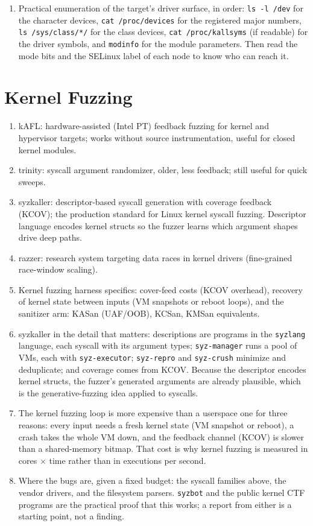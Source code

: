 \documentclass[12pt]{Training}
\begin{document}
\begin{enumerate}
    \item Practical enumeration of the target's driver surface, in order: \lstinline{ls -l /dev} for the character devices, \lstinline{cat /proc/devices} for the registered major numbers, \lstinline{ls /sys/class/*/} for the class devices, \lstinline{cat /proc/kallsyms} (if readable) for the driver symbols, and \lstinline{modinfo} for the module parameters. Then read the mode bits and the SELinux label of each node to know who can reach it.
\end{enumerate}

\section*{Kernel Fuzzing}
\begin{enumerate}
    \item kAFL: hardware-assisted (Intel PT) feedback fuzzing for kernel and hypervisor targets; works without source instrumentation, useful for closed kernel modules.
    \item trinity: syscall argument randomizer, older, less feedback; still useful for quick sweeps.
    \item syzkaller: descriptor-based syscall generation with coverage feedback (KCOV); the production standard for Linux kernel syscall fuzzing. Descriptor language encodes kernel structs so the fuzzer learns which argument shapes drive deep paths.
    \item razzer: research system targeting data races in kernel drivers (fine-grained race-window scaling).
    \item Kernel fuzzing harness specifics: cover-feed costs (KCOV overhead), recovery of kernel state between inputs (VM snapshots or reboot loops), and the sanitizer arm: KASan (UAF/OOB), KCSan, KMSan equivalents.
    \item syzkaller in the detail that matters: descriptions are programs in the \lstinline{syzlang} language, each syscall with its argument types; \lstinline{syz-manager} runs a pool of VMs, each with \lstinline{syz-executor}; \lstinline{syz-repro} and \lstinline{syz-crush} minimize and deduplicate; and coverage comes from KCOV. Because the descriptor encodes kernel structs, the fuzzer's generated arguments are already plausible, which is the generative-fuzzing idea applied to syscalls.
    \item The kernel fuzzing loop is more expensive than a userspace one for three reasons: every input needs a fresh kernel state (VM snapshot or reboot), a crash takes the whole VM down, and the feedback channel (KCOV) is slower than a shared-memory bitmap. That cost is why kernel fuzzing is measured in cores $\times$ time rather than in executions per second.
    \item Where the bugs are, given a fixed budget: the syscall families above, the vendor drivers, and the filesystem parsers. \lstinline{syzbot} and the public kernel CTF programs are the practical proof that this works; a report from either is a starting point, not a finding.
\end{enumerate}
\end{document}
